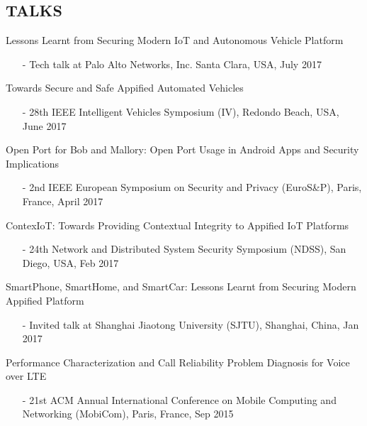 \documentclass[margin]{res}
\newcommand{\ignore}[1]{}
\begin{document}
\begin{resume}
\section{TALKS}

Lessons Learnt from Securing Modern IoT and Autonomous Vehicle Platform
\begin{itemize}
    \item[-] Tech talk at Palo Alto Networks, Inc. Santa Clara, USA, July 2017
\end{itemize}


Towards Secure and Safe Appified Automated Vehicles
\begin{itemize}
	\item[-] 28th IEEE Intelligent Vehicles Symposium (IV), Redondo Beach, USA, June 2017
\end{itemize}

Open Port for Bob and Mallory: Open Port Usage in Android Apps and Security Implications
\begin{itemize}
	\item[-] 2nd IEEE European Symposium on Security and Privacy (EuroS\&P), Paris, France, April 2017
\end{itemize}

ContexIoT: Towards Providing Contextual Integrity to Appified IoT Platforms
\begin{itemize}
	\item[-] 24th Network and Distributed System Security Symposium (NDSS), San Diego, USA, Feb 2017
\end{itemize}

SmartPhone, SmartHome, and SmartCar: Lessons Learnt from Securing Modern Appified Platform
\begin{itemize}
\item[-] Invited talk at Shanghai Jiaotong University (SJTU), Shanghai, China, Jan 2017
\end{itemize}

Performance Characterization and Call Reliability Problem Diagnosis for Voice over LTE
\begin{itemize}
\item[-] 21st  ACM Annual International Conference on Mobile Computing and Networking (MobiCom), Paris, France, Sep 2015
\end{itemize}



\ignore{
\section{RECENT\\ PROJECTS}

}
\end{resume}
\end{document}
